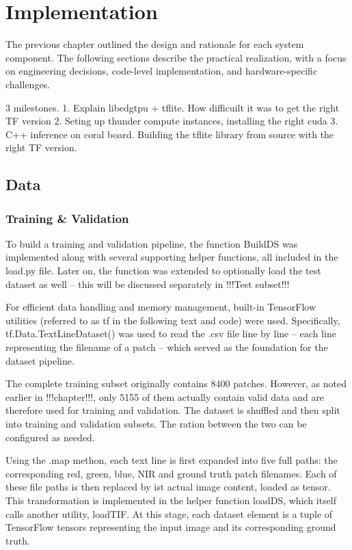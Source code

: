 {

\setlength{\parindent}{0pt}
\setlength{\parskip}{1em}

\chapter{Implementation}

The previous chapter outlined the design and rationale for each system component. The following sections describe the practical realization, with a focus on engineering decisions, code-level implementation, and hardware-specific challenges.


3 milestones.
1. Explain libedgtpu + tflite. How difficuilt it was to get the right TF version
2. Seting up thunder compute instances, installing the right cuda
3. C++ inference on coral board. Building the tflite library from source with the right TF version. 


\section{Data}

\subsection{Training \& Validation}

To build a training and validation pipeline, the function BuildDS was implemented along with several supporting helper functions, all included in the load.py file. Later on, the function was extended to optionally load the test dataset as well – this will be discussed separately in !!!Test subset!!!

For efficient data handling and memory management, built-in TensorFlow utilities (referred to as tf in the following text and code) were used. Specifically, tf.Data.TextLineDataset() was used to read the .csv file line by line – each line representing the filename of a patch – which served as the foundation for the dataset pipeline.

The complete training subset originally contains 8400 patches. However, as noted earlier in !!!chapter!!!, only 5155 of them actually contain valid data and are therefore used for training and validation. The dataset is shuffled and then split into training and validation subsets. The ration between the two can be configured as needed.

Using the .map methon, each text line is first expanded into five full paths: the corresponding red, green, blue, NIR and ground truth patch filenames. Each of these file paths is then replaced by ist actual image content, loaded as tensor. This transformation is implemented in the helper function loadDS, which itself calls another utility, loadTIF. At this stage, each dataset element is a tuple of TensorFlow tensors representing the input image and its corresponding ground truth.

}
